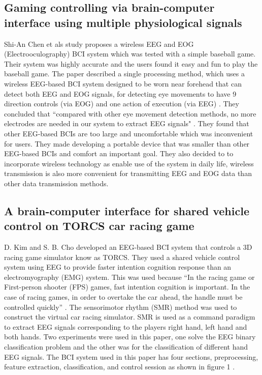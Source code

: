 \documentclass{scrartcl}
\begin{document}
\subsection*{Gaming controlling via brain-computer interface using multiple physiological signals}
Shi-An Chen et als study \cite{GamingControlling} proposes a wireless EEG and EOG (Electrooculography) BCI system which was tested with a simple baseball game. Their system was highly accurate and the users found it easy and fun to play the baseball game. The paper described a single processing method, which uses a wireless EEG-based BCI system designed to be worn near forehead that can detect both EEG and EOG signals, for detecting eye movements to have 9 direction controls
(via EOG) and one action of execution (via EEG) \cite{GamingControlling}. They concluded that ``compared with other eye movement detection methods, no more electrodes are needed in our system to extract EEG signals" \cite{GamingControlling}. They found that other EEG-based BCIs are too large and uncomfortable which was inconvenient for users. They made developing a portable device that was smaller than other EEG-based BCIs and comfort an important goal. They also decided to to incorporate wireless technology as enable use of the system in daily life, wireless transmission is also more convenient for transmitting EEG and EOG data than other data transmission methods. 

\subsection*{A brain-computer interface for shared vehicle control on TORCS car racing game}
\cite{SharedRacing} D. Kim and S. B. Cho developed an EEG-based BCI system that controls a 3D racing game simulator know as TORCS. They used a shared vehicle control system using EEG to provide faster intention cognition response than an electromyography (EMG) system. This was used because ``In the racing game or First-person shooter (FPS) games, fast intention cognition is important. In the case of racing games, in order to overtake the car ahead, the handle must be controlled quickly'' \cite{SharedRacing}. The sensorimotor rhythm (SMR) method was used to construct the virtual car racing simulator. SMR is used as a command paradigm to extract EEG signals corresponding to the players right hand, left hand and both hands. Two experiments were used in this paper, one solve the EEG binary classification problem and the other was for the classification of different hand EEG signals. The BCI system used in this paper has four sections, preprocessing, feature extraction, classification, and control session as shown in figure 1 \cite{SharedRacing}.
\end{document}
